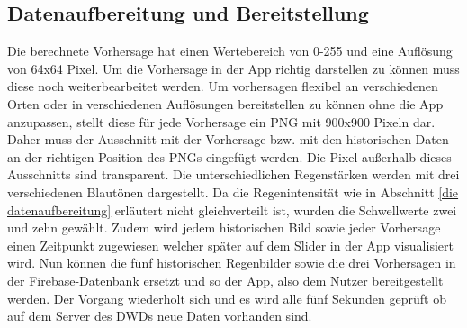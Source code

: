 \subsection{Datenaufbereitung und Bereitstellung}
Die berechnete Vorhersage hat einen Wertebereich von 0-255 und eine Auflösung von 64x64 Pixel.
Um die Vorhersage in der App richtig darstellen zu können muss diese noch weiterbearbeitet werden.
Um vorhersagen flexibel an verschiedenen Orten oder in verschiedenen Auflösungen bereitstellen zu können ohne die App anzupassen, stellt diese für jede Vorhersage ein PNG mit 900x900 Pixeln dar.
Daher muss der Ausschnitt mit der Vorhersage bzw. mit den historischen Daten an der richtigen Position des PNGs eingefügt werden.
Die Pixel außerhalb dieses Ausschnitts sind transparent.
Die unterschiedlichen Regenstärken werden mit drei verschiedenen Blautönen dargestellt.
Da die Regenintensität wie in Abschnitt \ref{die datenaufbereitung} erläutert nicht gleichverteilt ist, wurden die Schwellwerte zwei und zehn gewählt. 
Zudem wird jedem historischen Bild sowie jeder Vorhersage einen Zeitpunkt zugewiesen welcher später auf dem Slider in der App visualisiert wird.
Nun können die fünf historischen Regenbilder sowie die drei Vorhersagen in der Firebase-Datenbank ersetzt und so der App, also dem Nutzer bereitgestellt werden. 
Der Vorgang wiederholt sich und es wird alle fünf Sekunden geprüft ob auf dem Server des DWDs neue Daten vorhanden sind. 

